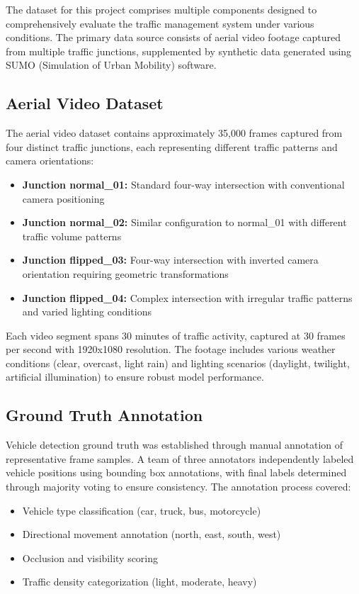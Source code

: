 \documentclass[conference]{IEEEtran}
\begin{document}
The dataset for this project comprises multiple components designed to comprehensively evaluate the traffic management system under various conditions. The primary data source consists of aerial video footage captured from multiple traffic junctions, supplemented by synthetic data generated using SUMO (Simulation of Urban Mobility) software.

\subsection{Aerial Video Dataset}

The aerial video dataset contains approximately 35,000 frames captured from four distinct traffic junctions, each representing different traffic patterns and camera orientations:

\begin{itemize}
\item \textbf{Junction normal\_01:} Standard four-way intersection with conventional camera positioning
\item \textbf{Junction normal\_02:} Similar configuration to normal\_01 with different traffic volume patterns
\item \textbf{Junction flipped\_03:} Four-way intersection with inverted camera orientation requiring geometric transformations
\item \textbf{Junction flipped\_04:} Complex intersection with irregular traffic patterns and varied lighting conditions
\end{itemize}

Each video segment spans 30 minutes of traffic activity, captured at 30 frames per second with 1920x1080 resolution. The footage includes various weather conditions (clear, overcast, light rain) and lighting scenarios (daylight, twilight, artificial illumination) to ensure robust model performance.

\subsection{Ground Truth Annotation}

Vehicle detection ground truth was established through manual annotation of representative frame samples. A team of three annotators independently labeled vehicle positions using bounding box annotations, with final labels determined through majority voting to ensure consistency. The annotation process covered:

\begin{itemize}
\item Vehicle type classification (car, truck, bus, motorcycle)
\item Directional movement annotation (north, east, south, west)
\item Occlusion and visibility scoring
\item Traffic density categorization (light, moderate, heavy)
\end{itemize}
\end{document}
